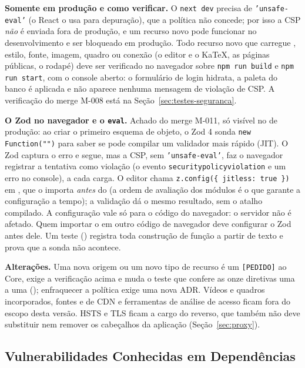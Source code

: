 \textbf{Somente em produção e como verificar.} O \texttt{next dev} precisa de \texttt{'unsafe-eval'} (o React o usa para depuração), que a política não concede; por isso a CSP \emph{não} é enviada fora de produção, e um recurso novo pode funcionar no desenvolvimento e ser bloqueado em produção. Todo recurso novo que carregue , estilo, fonte, imagem, quadro ou conexão (o editor e o KaTeX, as páginas públicas, o rodapé) deve ser verificado no navegador sobre \texttt{npm run build} e \texttt{npm run start}, com o console aberto: o formulário de login hidrata, a paleta do banco é aplicada e não aparece nenhuma mensagem de violação de CSP. A verificação do merge M-008 está na Seção~\ref{sec:testes-seguranca}.

\textbf{O Zod no navegador e o \texttt{eval}.} Achado do merge M-011, só visível no  de produção: ao criar o primeiro esquema de objeto, o Zod 4 sonda \texttt{new Function("")} para saber se pode compilar um validador mais rápido (JIT). O Zod captura o erro e segue, mas a CSP, sem \texttt{'unsafe-eval'}, faz o navegador registrar a tentativa como violação (o evento \texttt{securitypolicyviolation} e um erro no console), a cada carga. O editor chama \texttt{z.config(\{ jitless: true \})} em , que o  importa \emph{antes} do  (a ordem de avaliação dos módulos é o que garante a configuração a tempo); a validação dá o mesmo resultado, sem o atalho compilado. A configuração vale só para o código do navegador: o servidor não é afetado. Quem importar o  em outro código de navegador deve configurar o Zod antes dele. Um teste () registra toda construção de função a partir de texto e prova que a sonda não acontece.

\textbf{Alterações.} Uma nova origem ou um novo tipo de recurso é um \texttt{[PEDIDO]} ao Core, exige a verificação acima e muda o teste que confere as onze diretivas uma a uma (); enfraquecer a política exige uma nova ADR. Vídeos e quadros incorporados, fontes e  de CDN e ferramentas de análise de acesso ficam fora do escopo desta versão. HSTS e TLS ficam a cargo do  reverso, que também não deve substituir nem remover os cabeçalhos da aplicação (Seção~\ref{sec:proxy}).

\subsection{Vulnerabilidades Conhecidas em Dependências}\label{sec:arq-npm-audit}

